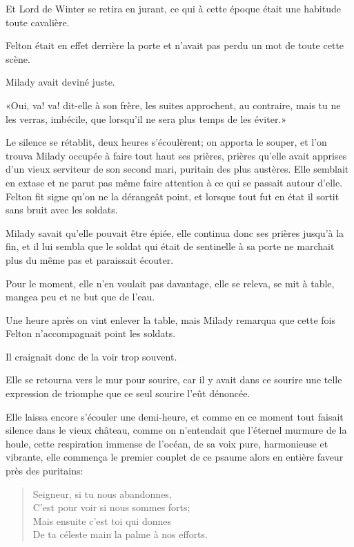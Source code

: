 Et Lord de Winter se retira en jurant, ce qui à cette époque était une habitude toute cavalière. 

Felton était en effet derrière la porte et n'avait pas perdu un mot de toute cette scène. 

Milady avait deviné juste. 

«Oui, va! va! dit-elle à son frère, les suites approchent, au contraire, mais tu ne les verras, imbécile, que lorsqu'il ne sera plus temps de les éviter.» 

Le silence se rétablit, deux heures s'écoulèrent; on apporta le souper, et l'on trouva Milady occupée à faire tout haut ses prières, prières qu'elle avait apprises d'un vieux serviteur de son second mari, puritain des plus austères. Elle semblait en extase et ne parut pas même faire attention à ce qui se passait autour d'elle. Felton fit signe qu'on ne la dérangeât point, et lorsque tout fut en état il sortit sans bruit avec les soldats. 

Milady savait qu'elle pouvait être épiée, elle continua donc ses prières jusqu'à la fin, et il lui sembla que le soldat qui était de sentinelle à sa porte ne marchait plus du même pas et paraissait écouter. 

Pour le moment, elle n'en voulait pas davantage, elle se releva, se mit à table, mangea peu et ne but que de l'eau. 

Une heure après on vint enlever la table, mais Milady remarqua que cette fois Felton n'accompagnait point les soldats. 

Il craignait donc de la voir trop souvent. 

Elle se retourna vers le mur pour sourire, car il y avait dans ce sourire une telle expression de triomphe que ce seul sourire l'eût dénoncée. 

Elle laissa encore s'écouler une demi-heure, et comme en ce moment tout faisait silence dans le vieux château, comme on n'entendait que l'éternel murmure de la houle, cette respiration immense de l'océan, de sa voix pure, harmonieuse et vibrante, elle commença le premier couplet de ce psaume alors en entière faveur près des puritains: 

\begin{a4}
	\clearpage
\end{a4}

\begin{verse}
Seigneur, si tu nous abandonnes,\\
C'est pour voir si nous sommes forts;\\
Mais ensuite c'est toi qui donnes\\
De ta céleste main la palme à nos efforts. 
\end{verse}

